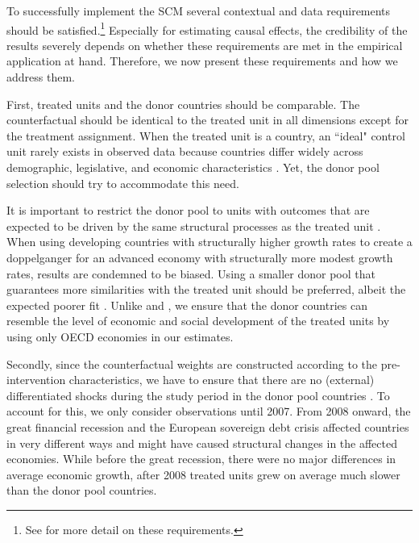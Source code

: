 \documentclass[12pt]{article}
\begin{document}
To successfully implement the SCM several contextual and data requirements should be satisfied.\footnote{See \cite{Abadie2019} for more detail on these requirements.} Especially for estimating causal effects, the credibility of the results severely depends on whether these requirements are met in the empirical application at hand. Therefore, we now present these requirements and how we address them. 
 
First, treated units and the donor countries should be comparable. The counterfactual should be identical to the treated unit in all dimensions except for the treatment assignment. When the treated unit is a country, an ``ideal" control unit rarely exists in observed data because countries differ widely across demographic, legislative, and economic characteristics \citep{Born2018}. Yet, the donor pool selection should try to accommodate this need. 

It is important to restrict the donor pool to units with outcomes that are expected to be driven by the same structural processes as the treated unit \citep{Abadie2015}. When using developing countries with structurally higher growth rates to create a doppelganger for an advanced economy with structurally more modest growth rates, results are condemned to be biased. Using a smaller donor pool that guarantees more similarities with the treated unit should be preferred, albeit the expected poorer fit \citep{Abadie2003}. Unlike \cite{Puzzello2018} and \cite{Gasparotti2019}, we ensure that the donor countries can resemble the level of economic and social development of the treated units by using only OECD economies in our estimates.


Secondly, since the counterfactual weights are constructed according to the pre-intervention characteristics, we have to ensure that there are no (external) differentiated shocks during the study period in the donor pool countries \citep{Abadie2019}. To account for this, we only consider observations until 2007. From 2008 onward, the great financial recession and the European sovereign debt crisis affected countries in very different ways and might have caused structural changes in the affected economies. While before the great recession, there were no major differences in average economic growth, after 2008 treated units grew on average much slower than the donor pool countries. 
\end{document}
